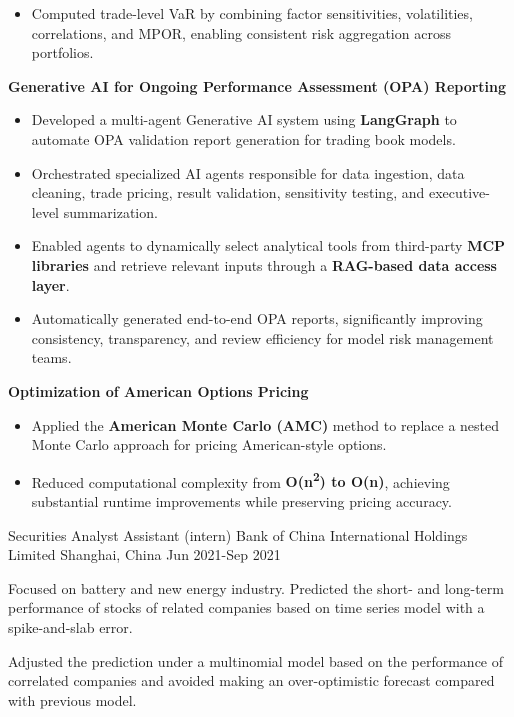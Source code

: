 \begin{cventries}
{\begin{cvitems}
\begin{itemize}
      \item Computed trade-level VaR by combining factor sensitivities, volatilities, correlations, and {MPOR}, enabling consistent risk aggregation across portfolios.
    \end{itemize}
    \item \textbf{Generative AI for Ongoing Performance Assessment (OPA) Reporting}
    \begin{itemize}
      \item Developed a {multi-agent Generative AI system} using \textbf{LangGraph} to automate OPA validation report generation for trading book models.
      \item Orchestrated specialized AI agents responsible for data ingestion, data cleaning, trade pricing, result validation, sensitivity testing, and executive-level summarization.
      \item Enabled agents to dynamically select analytical tools from third-party \textbf{MCP libraries} and retrieve relevant inputs through a \textbf{RAG-based data access layer}.
      \item Automatically generated end-to-end OPA reports, significantly improving consistency, transparency, and review efficiency for model risk management teams.
    \end{itemize}
    \item \textbf{Optimization of American Options Pricing}
    \begin{itemize}
      \item Applied the \textbf{American Monte Carlo (AMC)} method to replace a nested Monte Carlo approach for pricing American-style options.
      \item Reduced computational complexity from \textbf{O(n\textsuperscript{2}) to O(n)}, achieving substantial runtime improvements while preserving pricing accuracy.
    \end{itemize}
  \end{cvitems}
}

  \cventry
    {Securities Analyst Assistant (intern)} %
    {Bank of China International Holdings Limited} %
    {Shanghai, China} %
    {Jun 2021-Sep 2021} %
    {
      \begin{cvitems} %
        \item {Focused on battery and new energy industry. Predicted the short- and long-term performance of stocks of related companies based on time series model with a spike-and-slab error.}
        \item {Adjusted the prediction under a multinomial model based on the performance of correlated companies and avoided making an over-optimistic forecast compared with previous model.}
      \end{cvitems}
    }


\end{cventries}

